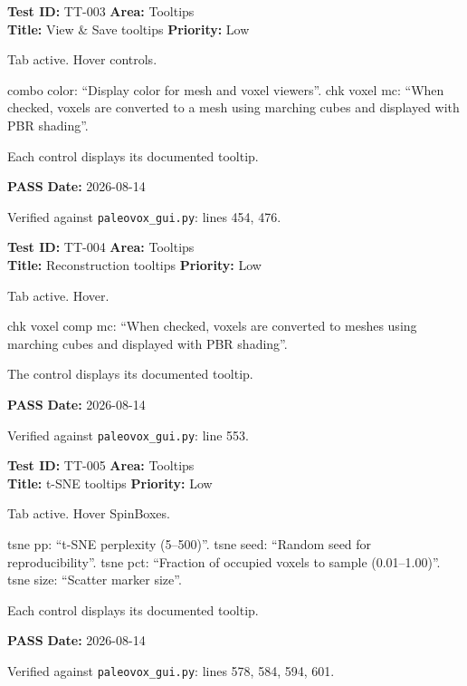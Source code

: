\documentclass[12pt,a4paper]{article}
\newcommand{\pass}{\textcolor{paleogreen}{\textbf{PASS}}}
\newcommand{\testheader}[4]{%
  \smallskip
  \noindent\textbf{Test ID:} #1 \hfill \textbf{Area:} #2 \\
  \textbf{Title:} #3 \hfill \textbf{Priority:} #4
}
\newenvironment{testbody}{%
  \begin{description}[leftmargin=2em,style=nextline]
}{%
  \end{description}
  \smallskip
}
\begin{document}
\testheader{TT-003}{Tooltips}{View \& Save tooltips}{Low}
\begin{testbody}
  \item[\textbf{Preconditions:}] Tab active. Hover controls.
  \item[\textbf{Steps:}] combo color: ``Display color for mesh and voxel
        viewers''. chk voxel mc: ``When checked, voxels are converted to a mesh
        using marching cubes and displayed with PBR shading''.
  \item[\textbf{Expected Result:}] Each control displays its documented
        tooltip.
  \item[\textbf{Status:}] \pass{} \hspace{1em} \textbf{Date:} 2026-08-14
  \item[\textbf{Notes:}] Verified against \texttt{paleovox\_gui.py}: lines 454,
        476.
\end{testbody}

\testheader{TT-004}{Tooltips}{Reconstruction tooltips}{Low}
\begin{testbody}
  \item[\textbf{Preconditions:}] Tab active. Hover.
  \item[\textbf{Steps:}] chk voxel comp mc: ``When checked, voxels are
        converted to meshes using marching cubes and displayed with PBR
        shading''.
  \item[\textbf{Expected Result:}] The control displays its documented tooltip.
  \item[\textbf{Status:}] \pass{} \hspace{1em} \textbf{Date:} 2026-08-14
  \item[\textbf{Notes:}] Verified against \texttt{paleovox\_gui.py}: line 553.
\end{testbody}

\testheader{TT-005}{Tooltips}{t-SNE tooltips}{Low}
\begin{testbody}
  \item[\textbf{Preconditions:}] Tab active. Hover SpinBoxes.
  \item[\textbf{Steps:}] tsne pp: ``t-SNE perplexity (5--500)''. tsne seed:
        ``Random seed for reproducibility''. tsne pct: ``Fraction of occupied
        voxels to sample (0.01--1.00)''. tsne size: ``Scatter marker size''.
  \item[\textbf{Expected Result:}] Each control displays its documented
        tooltip.
  \item[\textbf{Status:}] \pass{} \hspace{1em} \textbf{Date:} 2026-08-14
  \item[\textbf{Notes:}] Verified against \texttt{paleovox\_gui.py}: lines 578,
        584, 594, 601.
\end{testbody}
\end{document}
